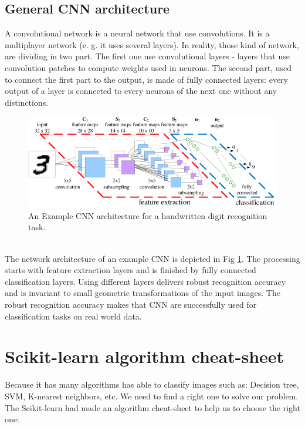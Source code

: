 \documentclass[hidelinks,12pt,a4paper]{report}
\begin{document}
\subsection{General CNN architecture}
A convolutional network is a neural network that use convolutions. It is a multiplayer network (e. g. it uses several layers). In reality, those kind of network, are dividing in two part. The first one use convolutional layers - layers that use convolution patches to compute weights used in neurons. The second part, used to connect the first part to the output, is made of fully connected layers: every output of a layer is connected to every neurons of the next one without any distinctions.
\begin{figure}[ht]
	\includegraphics[scale=1, center]{images/Fig-1-An-Example-CNN-architecture-for-a-handwritten-digit-recognition-task}
	\caption{An Example CNN architecture for a handwritten digit recognition task.}
	\label{fig:CNN-architecture}
\end{figure}\\
The network architecture of an example CNN is depicted in Fig \ref{fig:CNN-architecture}. The processing starts with feature extraction layers and is finished by fully connected classification layers. Using different layers delivers robust recognition accuracy and is invariant to small geometric transformations of the input images. The robust recognition accuracy makes that CNN are successfully used for classification tasks on real world data.\\

\section{Scikit-learn algorithm cheat-sheet}
Because it has many algorithms has able to classify images such as: Decision tree\cite{j.r.quinlan1985}, SVM\cite{stever.gunn1998}, K-nearest neighbors\cite{orenanavakfiry.levy2017}, etc. We need to find a right one to solve our problem. The Scikit-learn\cite{scikitlearn.org} had made an algorithm cheat-sheet to help us to choose the right one:
\end{document}
